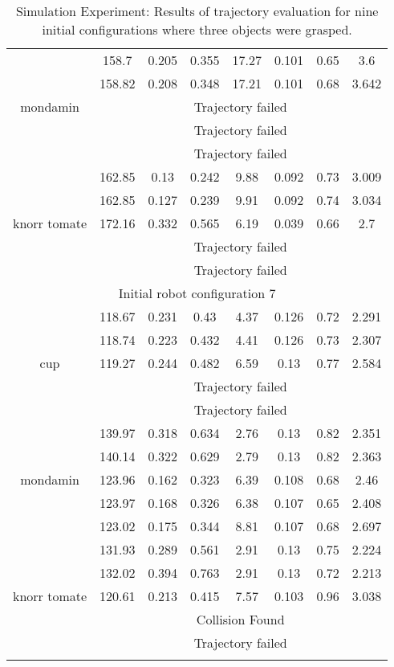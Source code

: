 {\begin{center}
\begin{longtable}[c]{ | c | c | c | c | c | c | c || c || }
\hline 
\multirow{5}{1.5cm}{mondamin}& 158.7 & 0.205 & 0.355 & 17.27 & 0.101 & 0.65 & 3.6 \\
& 158.82 & 0.208 & 0.348 & 17.21 & 0.101 & 0.68 & 3.642 \\
& \multicolumn{7}{c|}{Trajectory failed} \\
& \multicolumn{7}{c|}{Trajectory failed} \\
& \multicolumn{7}{c|}{Trajectory failed} \\
\hline 
\multirow{5}{1.5cm}{knorr tomate}& 162.85 & 0.13 & 0.242 & 9.88 & 0.092 & 0.73 & 3.009 \\
& 162.85 & 0.127 & 0.239 & 9.91 & 0.092 & 0.74 & 3.034 \\
& 172.16 & 0.332 & 0.565 & 6.19 & 0.039 & 0.66 & 2.7 \\
& \multicolumn{7}{c|}{Trajectory failed} \\
& \multicolumn{7}{c|}{Trajectory failed} \\
\hline 
\multicolumn{8}{|c|}{Initial robot configuration 7} \\
\hline
\multirow{5}{1.5cm}{cup}& 118.67 & 0.231 & 0.43 & 4.37 & 0.126 & 0.72 & 2.291 \\
& 118.74 & 0.223 & 0.432 & 4.41 & 0.126 & 0.73 & 2.307 \\
& 119.27 & 0.244 & 0.482 & 6.59 & 0.13 & 0.77 & 2.584 \\
& \multicolumn{7}{c|}{Trajectory failed} \\
& \multicolumn{7}{c|}{Trajectory failed} \\
\hline 
\multirow{5}{1.5cm}{mondamin}& 139.97 & 0.318 & 0.634 & 2.76 & 0.13 & 0.82 & 2.351 \\
& 140.14 & 0.322 & 0.629 & 2.79 & 0.13 & 0.82 & 2.363 \\
& 123.96 & 0.162 & 0.323 & 6.39 & 0.108 & 0.68 & 2.46 \\
& 123.97 & 0.168 & 0.326 & 6.38 & 0.107 & 0.65 & 2.408 \\
& 123.02 & 0.175 & 0.344 & 8.81 & 0.107 & 0.68 & 2.697 \\
\hline 
\multirow{5}{1.5cm}{knorr tomate}& 131.93 & 0.289 & 0.561 & 2.91 & 0.13 & 0.75 & 2.224 \\
& 132.02 & 0.394 & 0.763 & 2.91 & 0.13 & 0.72 & 2.213 \\
& 120.61 & 0.213 & 0.415 & 7.57 & 0.103 & 0.96 & 3.038 \\
& \multicolumn{7}{c|}{Collision Found} \\
& \multicolumn{7}{c|}{Trajectory failed} \\
\hline 

\hline

\caption{Simulation Experiment: Results of trajectory evaluation for nine initial configurations where three objects were grasped.}
\label{table:sim} 
\end{longtable}
\end{center}
}
